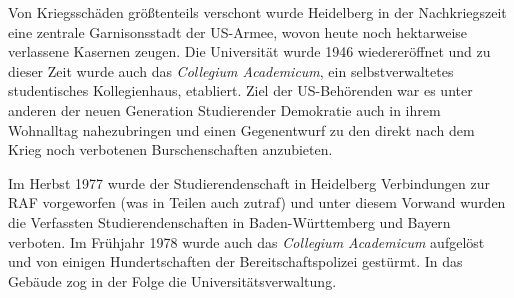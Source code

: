 Von Kriegsschäden größtenteils verschont wurde Heidelberg in der Nachkriegszeit eine zentrale Garnisonsstadt der US-Armee, wovon heute noch hektarweise verlassene Kasernen zeugen. Die Universität wurde 1946 wiedereröffnet und zu dieser Zeit wurde auch das \textit{Collegium Academicum}, ein selbstverwaltetes studentisches Kollegienhaus, etabliert. Ziel der US-Behörenden war es unter anderen der neuen Generation Studierender Demokratie auch in ihrem Wohnalltag nahezubringen und einen Gegenentwurf zu den direkt nach dem Krieg noch verbotenen Burschenschaften anzubieten.

Im Herbst 1977 wurde der Studierendenschaft in Heidelberg Verbindungen zur RAF vorgeworfen (was in Teilen auch zutraf) und unter diesem Vorwand wurden die Verfassten Studierendenschaften in Baden-Württemberg und Bayern verboten. Im Frühjahr 1978 wurde auch das \textit{Collegium Academicum} aufgelöst und von einigen Hundertschaften der Bereitschaftspolizei gestürmt. In das Gebäude zog in der Folge die Universitätsverwaltung.
